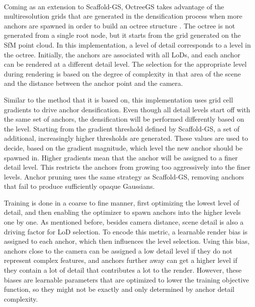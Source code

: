\paragraph{}
Coming as an extension to Scaffold-GS, OctreeGS takes advantage of the multiresolution grids that are generated in the densification process when more anchors are spawned in order to build an octree structure \cite{ren2024octreegs}. The octree is not generated from a single root node, but it starts from the grid generated on the SfM point cloud. In this implementation, a level of detail corresponds to a level in the octree. Initially, the anchors are associated with all LoDs, and each anchor can be rendered at a different detail level. The selection for the appropriate level during rendering is based on the degree of complexity in that area of the scene and the distance between the anchor point and the camera. 

Similar to the method that it is based on, this implementation uses grid cell gradients to drive anchor densification. Even though all detail levels start off with the same set of anchors, the densification will be performed differently based on the level. Starting from the gradient threshold defined by Scaffold-GS, a set of additional, increasingly higher thresholds are generated. These values are used to decide, based on the gradient magnitude, which level the new anchor should be spawned in. Higher gradients mean that the anchor will be assigned to a finer detail level. This restricts the anchors from growing too aggressively into the finer levels. Anchor pruning uses the same strategy as Scaffold-GS, removing anchors that fail to produce sufficiently opaque Gaussians.

Training is done in a coarse to fine manner, first optimizing the lowest level of detail, and then enabling the optimizer to spawn anchors into the higher levels one by one. As mentioned before, besides camera distance, scene detail is also a driving factor for LoD selection. To encode this metric, a learnable render bias is assigned to each anchor, which then influences the level selection. Using this bias, anchors close to the camera can be assigned a low detail level if they do not represent complex features, and anchors further away can get a higher level if they contain a lot of detail that contributes a lot to the render. However, these biases are learnable parameters that are optimized to lower the training objective function, so they might not be exactly and only determined by anchor detail complexity. 

